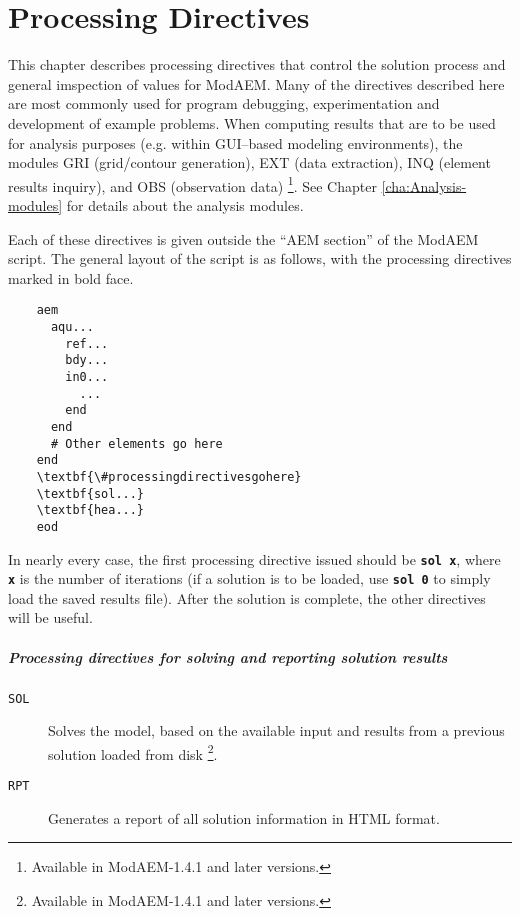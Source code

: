 \chapter{Processing Directives\label{cha:Processing-Directives} }

This chapter describes processing directives that control the solution
process and general imspection of values for ModAEM. Many of the directives
described here are most commonly used for program debugging, experimentation
and development of example problems. When computing results that are
to be used for analysis purposes (e.g. within GUI--based modeling
environments), the modules GRI (grid/contour generation), EXT (data
extraction), INQ (element results inquiry), and OBS (observation data)%
\footnote{Available in ModAEM-1.4.1 and later versions.%
}. See Chapter \ref{cha:Analysis-modules} for details about the analysis
modules.

Each of these directives is given outside the ``AEM section'' of
the ModAEM script. The general layout of the script is as follows,
with the processing directives marked in bold face.

\begin{verbatim}
    aem
      aqu...
        ref...
        bdy...
        in0...
          ...
        end
      end
      # Other elements go here
    end
    \textbf{\#processingdirectivesgohere}
    \textbf{sol...}
    \textbf{hea...}
    eod
\end{verbatim}
In nearly every case, the first processing directive issued should
be \texttt{\textbf{sol x}}, where \texttt{\textbf{x}} is the number
of iterations (if a solution is to be loaded, use \texttt{\textbf{sol
0}} to simply load the saved results file). After the solution is
complete, the other directives will be useful.


\paragraph{Processing directives for solving and reporting solution results }
\begin{description}
\item [{\texttt{SOL}}] Solves the model, based on the available input and
results from a previous solution loaded from disk%
\footnote{Available in ModAEM-1.4.1 and later versions.%
}.
\item [{\texttt{RPT}}] Generates a report of all solution information in
HTML format.
\end{description}

